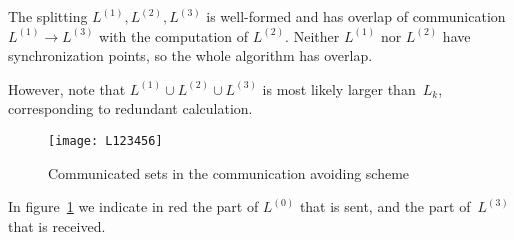 \begin{theorem}
  The splitting $L^{(1)},L^{(2)},L^{(3)}$ is well-formed and has overlap
  of communication $L^{(1)}\rightarrow L^{(3)}$ with the computation of $L^{(2)}$.
  Neither $L^{(1)}$ nor $L^{(2)}$ have synchronization points, so the whole algorithm
  has overlap.
\end{theorem}

However, note that $L^{(1)}\cup L^{(2)}\cup L^{(3)}$ is most
likely larger than~$L_{k}$,
corresponding to redundant calculation.


\begin{figure}[ht]
  \texttt{[image: L123456]}
  \caption{Communicated sets in the communication avoiding scheme}
  \label{fig:avoid-comm}
\end{figure}

In figure~\ref{fig:avoid-comm} we indicate in red the part of
$L^{(0)}$ that is sent, and the part of~$L^{(3)}$ that is received.
